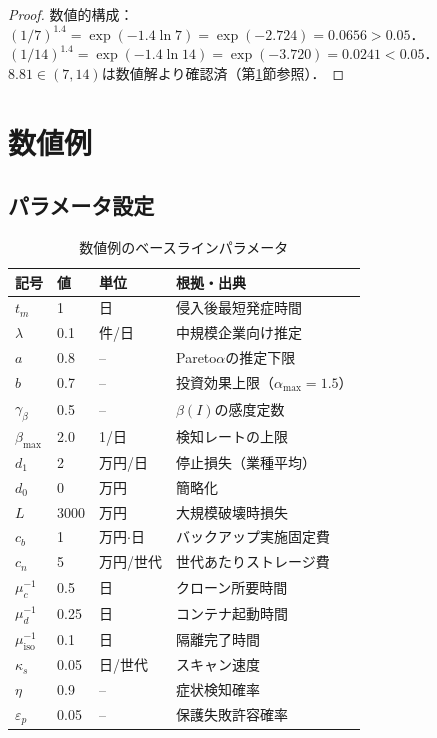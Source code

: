 \documentclass[12pt,a4paper]{article}
\theoremstyle{plain}
\theoremstyle{definition}
\theoremstyle{remark}
\begin{document}
\begin{proof}
数値的構成：$(1/7)^{1.4}=\exp(-1.4\ln7)=\exp(-2.724)=0.0656>0.05$．
$(1/14)^{1.4}=\exp(-1.4\ln14)=\exp(-3.720)=0.0241<0.05$．
$8.81\in(7,14)$は数値解より確認済（第\ref{sec:numerical}節参照）．
\end{proof}

\section{数値例}
\label{sec:numerical}

\subsection{パラメータ設定}

\begin{table}[h]
\centering
\caption{数値例のベースラインパラメータ}
\label{tab:params}
\begin{tabular}{@{}llll@{}}
\toprule
記号 & 値 & 単位 & 根拠・出典 \\
\midrule
$t_m$ & 1 & 日 & 侵入後最短発症時間~\cite{mandiant2023} \\
$\lambda$ & 0.1 & 件/日 & 中規模企業向け推定 \\
$a$ & 0.8 & -- & Pareto$\alpha$の推定下限 \\
$b$ & 0.7 & -- & 投資効果上限（$\alpha_{\max}=1.5$）\\
$\gamma_\beta$ & 0.5 & -- & $\beta(I)$の感度定数 \\
$\beta_{\max}$ & 2.0 & 1/日 & 検知レートの上限 \\
$d_1$ & 2 & 万円/日 & 停止損失（業種平均） \\
$d_0$ & 0 & 万円 & 簡略化 \\
$L$ & 3000 & 万円 & 大規模破壊時損失 \\
$c_b$ & 1 & 万円$\cdot$日 & バックアップ実施固定費 \\
$c_n$ & 5 & 万円/世代 & 世代あたりストレージ費 \\
$\mu_c^{-1}$ & 0.5 & 日 & クローン所要時間 \\
$\mu_d^{-1}$ & 0.25 & 日 & コンテナ起動時間 \\
$\mu_{\mathrm{iso}}^{-1}$ & 0.1 & 日 & 隔離完了時間 \\
$\kappa_s$ & 0.05 & 日/世代 & スキャン速度 \\
$\eta$ & 0.9 & -- & 症状検知確率 \\
$\varepsilon_p$ & 0.05 & -- & 保護失敗許容確率 \\
\bottomrule
\end{tabular}
\end{table}
\end{document}
